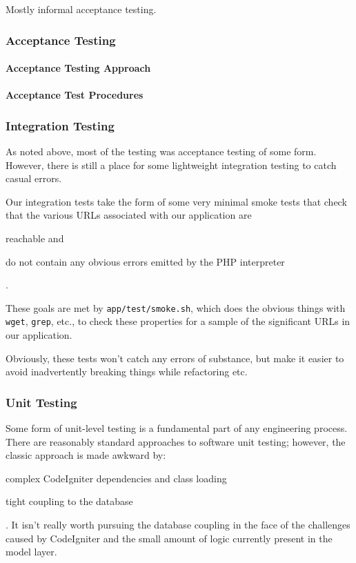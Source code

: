 Mostly informal acceptance testing.

\subsubsection{Acceptance Testing}

\paragraph{Acceptance Testing Approach}

\paragraph{Acceptance Test Procedures}

\subsubsection{Integration Testing}

As noted above, most of the testing was acceptance testing of some
form. However, there is still a place for some lightweight integration
testing to catch casual errors.

Our integration tests take the form of some very minimal smoke tests
that check that the various URLs associated with our application are
\begin{inparaenum}
\item reachable and
\item do not contain any obvious errors emitted by the PHP interpreter
\end{inparaenum}.

These goals are met by \verb!app/test/smoke.sh!, which does the
obvious things with \texttt{wget}, \texttt{grep}, etc., to check these
properties for a sample of the significant URLs in our application.

Obviously, these tests won't catch any errors of substance, but make
it easier to avoid inadvertently breaking things while refactoring
etc.

\subsubsection{Unit Testing}

Some form of unit-level testing is a fundamental part of any
engineering process. There are reasonably standard approaches to
software unit testing; however, the classic approach is made awkward
by:
\begin{inparaenum}
\item complex CodeIgniter dependencies and class loading
\item tight coupling to the database
\end{inparaenum}.
It isn't really worth pursuing the database coupling in the face of
the challenges caused by CodeIgniter and the small amount of logic
currently present in the model layer.

